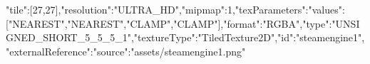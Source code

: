 {"tile":[27,27],"resolution":"ULTRA_HD","mipmap":1,"texParameters":{"values":["NEAREST","NEAREST","CLAMP","CLAMP"]},"format":"RGBA","type":"UNSIGNED_SHORT_5_5_5_1","textureType":"TiledTexture2D","id":"steamengine1","externalReference":{"source":"assets/steamengine1.png"}}